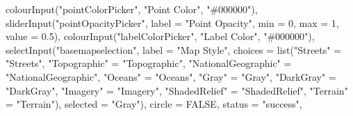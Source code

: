 \documentclass[
]{article}
\newenvironment{Shaded}{\begin{snugshade}}{\end{snugshade}}
\newcommand{\AttributeTok}[1]{\textcolor[rgb]{0.77,0.63,0.00}{#1}}
\newcommand{\ConstantTok}[1]{\textcolor[rgb]{0.00,0.00,0.00}{#1}}
\newcommand{\DecValTok}[1]{\textcolor[rgb]{0.00,0.00,0.81}{#1}}
\newcommand{\FloatTok}[1]{\textcolor[rgb]{0.00,0.00,0.81}{#1}}
\newcommand{\FunctionTok}[1]{\textcolor[rgb]{0.00,0.00,0.00}{#1}}
\newcommand{\NormalTok}[1]{#1}
\newcommand{\OtherTok}[1]{\textcolor[rgb]{0.56,0.35,0.01}{#1}}
\newcommand{\StringTok}[1]{\textcolor[rgb]{0.31,0.60,0.02}{#1}}
\begin{document}
\begin{Shaded}
\begin{Highlighting}[]
                                      \FunctionTok{colourInput}\NormalTok{(}\StringTok{"pointColorPicker"}\NormalTok{, }\StringTok{"Point Color"}\NormalTok{, }\StringTok{"\#000000"}\NormalTok{),}
                                      \FunctionTok{sliderInput}\NormalTok{(}\StringTok{"pointOpacityPicker"}\NormalTok{,}
                                                  \AttributeTok{label =} \StringTok{"Point Opacity"}\NormalTok{,}
                                                  \AttributeTok{min =} \DecValTok{0}\NormalTok{, }\AttributeTok{max =} \DecValTok{1}\NormalTok{, }\AttributeTok{value =} \FloatTok{0.5}\NormalTok{),}
                                      \FunctionTok{colourInput}\NormalTok{(}\StringTok{"labelColorPicker"}\NormalTok{, }\StringTok{"Label Color"}\NormalTok{, }\StringTok{"\#000000"}\NormalTok{),}
                                      \FunctionTok{selectInput}\NormalTok{(}\StringTok{"basemapselection"}\NormalTok{,}
                                                  \AttributeTok{label =} \StringTok{"Map Style"}\NormalTok{,}
                                                  \AttributeTok{choices =} \FunctionTok{list}\NormalTok{(}\StringTok{"Streets"} \OtherTok{=} \StringTok{"Streets"}\NormalTok{,}
                                                                 \StringTok{"Topographic"} \OtherTok{=} \StringTok{"Topographic"}\NormalTok{,}
                                                                 \StringTok{"NationalGeographic"} \OtherTok{=} \StringTok{"NationalGeographic"}\NormalTok{,}
                                                                 \StringTok{"Oceans"} \OtherTok{=} \StringTok{"Oceans"}\NormalTok{,}
                                                                 \StringTok{"Gray"} \OtherTok{=} \StringTok{"Gray"}\NormalTok{,}
                                                                 \StringTok{"DarkGray"} \OtherTok{=} \StringTok{"DarkGray"}\NormalTok{,}
                                                                 \StringTok{"Imagery"} \OtherTok{=} \StringTok{"Imagery"}\NormalTok{,}
                                                                 \StringTok{"ShadedRelief"} \OtherTok{=} \StringTok{"ShadedRelief"}\NormalTok{,}
                                                                 \StringTok{"Terrain"} \OtherTok{=} \StringTok{"Terrain"}\NormalTok{),}
                                                  \AttributeTok{selected =} \StringTok{"Gray"}\NormalTok{),}
                                      \AttributeTok{circle =} \ConstantTok{FALSE}\NormalTok{,}
                                      \AttributeTok{status =} \StringTok{"success"}\NormalTok{,}

\end{Highlighting}
\end{Shaded}
\end{document}
